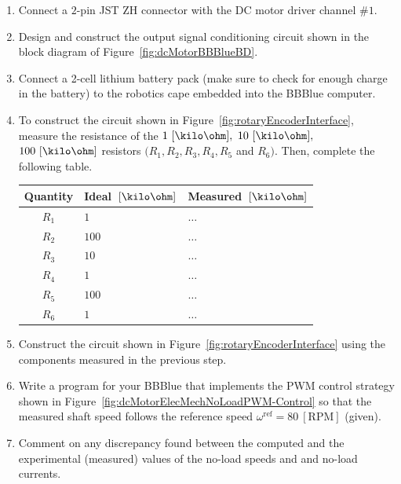 \begin{enumerate}

\item Connect a $2$-pin JST ZH connector with the DC motor driver channel $\#1.$
  
\item Design and construct the output signal conditioning circuit shown in the block diagram of Figure~\ref{fig:dcMotorBBBlueBD}.

\item Connect a 2-cell lithium battery pack (make sure to check for enough charge in the battery) to the robotics cape embedded into the BBBlue computer.
  
\item To construct the circuit shown in Figure~\ref{fig:rotaryEncoderInterface}, measure the resistance of the $1~[\kilo\ohm],$ $10~[\kilo\ohm],$ $100~[\kilo\ohm]$  resistors $(R_1,R_2,R_3,R_4,R_5$ and $R_6).$ Then, complete the following table.

  \begin{center}
    \begin{tabular}{c|l|l}
      \toprule
      Quantity &  Ideal~$[\kilo\ohm]$ & Measured~$[\kilo\ohm]$\\
      \toprule
      $R_1$ & $1$ & $\ldots$\\   %
      $R_2$ & $100$ & $\ldots$\\   %
      $R_3$ & $10$ & $\ldots$\\   %
      $R_4$ & $1$ & $\ldots$\\   %
      $R_5$ & $100$ & $\ldots$\\   %
      $R_6$ & $1$ & $\ldots$\\   %
      \bottomrule
    \end{tabular}    
  \end{center}
  
\item Construct the circuit shown in Figure~\ref{fig:rotaryEncoderInterface} using the components measured in the previous step.

 
\item Write a program for your BBBlue  that implements the PWM control strategy shown in Figure~\ref{fig:dcMotorElecMechNoLoadPWM-Control} so that the measured shaft speed follows the reference speed $\omega^{\mathrm{ref}} = 80~[\mathrm{RPM}]$ (given).
  



\item Comment on any discrepancy found between the computed and the experimental (measured) values of the no-load speeds  and and no-load currents. 

  
\end{enumerate}







